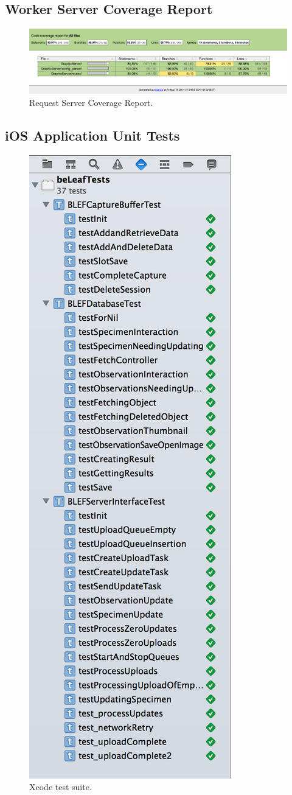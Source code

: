 \documentclass[a4paper,11pt]{article}
\begin{document}
\begin{description}
\subsection{Worker Server Coverage Report}
\begin{figure}[h!]
  \centering
  \includegraphics[width=0.7\linewidth]{worker_server_coverage.png}
  \caption{Request Server Coverage Report.}
\end{figure}

\subsection{iOS Application Unit Tests}
\begin{figure}[H]
	\centering
	\includegraphics[width=0.3\linewidth]{images/ios_test_results.png}
	\caption{Xcode test suite.}
\end{figure}

\end{description}
\clearpage
\end{document}
